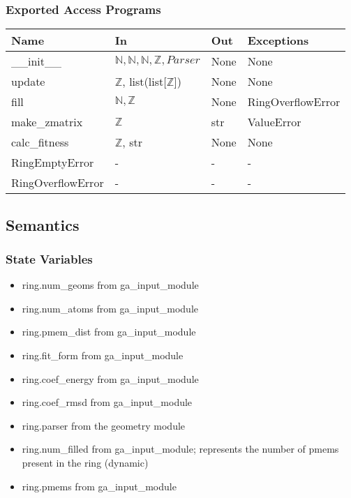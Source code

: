 \documentclass[12pt, titlepage]{article}
\begin{document}
\subsubsection{Exported Access Programs}

\begin{center}
	\begin{tabular}{p{4cm} p{4cm} p{2cm} p{2cm}}
		\hline
		\textbf{Name} & \textbf{In} & \textbf{Out} & \textbf{Exceptions} \\
		\hline
		\_\_init\_\_ & $\mathbb{N}, \mathbb{N}, \mathbb{N}, \mathbb{Z}, Parser$ 
		& None & None \\
		update & $\mathbb{Z}$, list(list[$\mathbb{Z}$]) & None & None \\
		fill & $\mathbb{N}, \mathbb{Z}$ & None & RingOverflowError \\
		make\_zmatrix & $\mathbb{Z}$ & str & ValueError \\
		calc\_fitness & $\mathbb{Z}$, str & None & None \\
		RingEmptyError  & - & - & - \\
		RingOverflowError & - & - & - \\
		\hline
	\end{tabular}
\end{center}

\subsection{Semantics}

\subsubsection{State Variables}

\begin{itemize}
\item ring.num\_geoms from ga\_input\_module
\item ring.num\_atoms from ga\_input\_module
\item ring.pmem\_dist from ga\_input\_module
\item ring.fit\_form from ga\_input\_module
\item ring.coef\_energy from ga\_input\_module
\item ring.coef\_rmsd from ga\_input\_module
\item ring.parser from the geometry module
\item ring.num\_filled from ga\_input\_module; represents the number of pmems 
present in the ring (dynamic)
\item ring.pmems from ga\_input\_module
\end{itemize}
\end{document}

